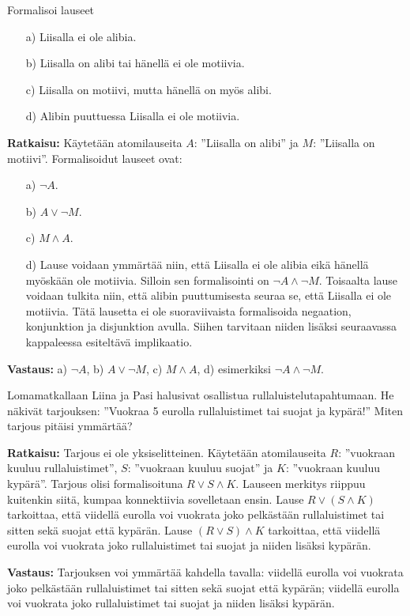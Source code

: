 \begin{esimerkki}
Formalisoi lauseet
\begin{itemize}
\item[a)] Liisalla ei ole alibia. 
\item[b)] Liisalla on alibi tai hänellä ei ole motiivia.
\item[c)] Liisalla on motiivi, mutta hänellä on myös alibi.
\item[d)] Alibin puuttuessa Liisalla ei ole motiivia. 
\end{itemize}

{\bf Ratkaisu:}
Käytetään atomilauseita $A$: ''Liisalla on alibi'' ja $M$: ''Liisalla on motiivi''.	
Formalisoidut lauseet ovat:
\begin{itemize}
\item[a)] $\lnot A$.
\item[b)] $A \lor \lnot M$.
\item[c)] $M\land A$.
\item[d)] Lause voidaan ymmärtää niin, että Liisalla ei ole alibia eikä hänellä myöskään ole motiivia. Silloin sen formalisointi on $\lnot A \land \lnot M$. Toisaalta lause voidaan tulkita niin, että alibin puuttumisesta seuraa se, että Liisalla ei ole motiivia. Tätä lausetta ei ole suoraviivaista formalisoida negaation, konjunktion ja disjunktion avulla. Siihen tarvitaan niiden lisäksi seuraavassa kappaleessa esiteltävä implikaatio. 
\end{itemize}

{\bf Vastaus:}
a) $\lnot A$, b) $A \lor \lnot M$, c) $M\land A$, d) esimerkiksi 
$\lnot A \land \lnot M$.
\end{esimerkki}

\begin{esimerkki}
Lomamatkallaan Liina ja Pasi halusivat osallistua rullaluistelutapahtumaan. He  näkivät tarjouksen: ''Vuokraa 5 eurolla rullaluistimet tai suojat ja kypärä!'' Miten tarjous pitäisi ymmärtää?

{\bf Ratkaisu:}
Tarjous ei ole yksiselitteinen. Käytetään atomilauseita $R$: ''vuokraan kuuluu rullaluistimet'', $S$: ''vuokraan kuuluu suojat'' ja $K$: ''vuokraan kuuluu kypärä''. Tarjous olisi formalisoituna $R\lor S \land K$. Lauseen merkitys riippuu kuitenkin siitä, kumpaa	konnektiivia sovelletaan ensin. Lause $R\lor (S\land K)$ tarkoittaa, että viidellä eurolla voi vuokrata joko pelkästään rullaluistimet tai sitten sekä suojat että kypärän. Lause $(R\lor S)\land K$ tarkoittaa, että viidellä eurolla voi vuokrata joko rullaluistimet tai suojat ja niiden lisäksi kypärän. 

{\bf Vastaus:} Tarjouksen voi ymmärtää kahdella tavalla:
viidellä eurolla voi vuokrata joko pelkästään rullaluistimet tai sitten sekä suojat että kypärän; viidellä eurolla voi vuokrata joko rullaluistimet tai suojat ja niiden lisäksi kypärän.
\end{esimerkki}

